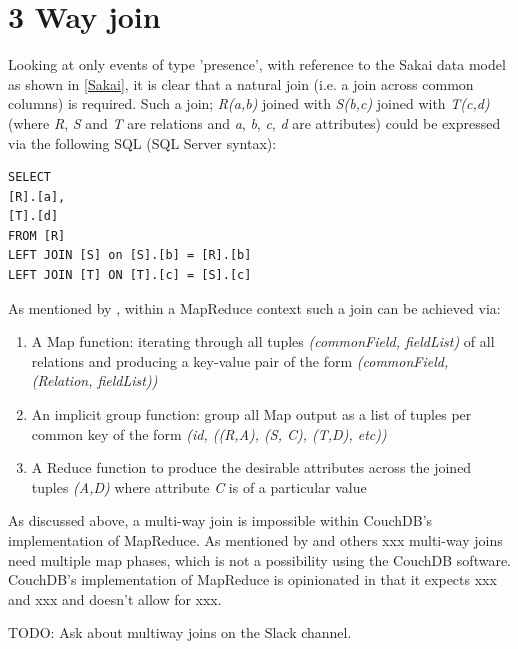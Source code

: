 \section{3 Way join}

Looking at only events of type 'presence', with reference to the Sakai data model as shown in \ref{Sakai}, it is clear that a natural join (i.e. a join across common columns) is required. Such a join; \textit{R(a,b)} joined with \textit{S(b,c)} joined with \textit{T(c,d)} (where \textit{R}, \textit{S} and \textit{T} are relations and \textit{a}, \textit{b}, \textit{c}, \textit{d} are attributes) could be expressed via the following SQL (SQL Server syntax):

\begin{verbatim}
SELECT
[R].[a],
[T].[d]
FROM [R]
LEFT JOIN [S] on [S].[b] = [R].[b]
LEFT JOIN [T] ON [T].[c] = [S].[c]
\end{verbatim}

As mentioned by \cite{mining2011}, within a MapReduce context such a join can be achieved via:
\begin{enumerate}
    \item A Map function: iterating through all tuples \textit{(commonField, fieldList)} of all relations and producing a key-value pair of the form \textit{(commonField, (Relation, fieldList))}
    \item An implicit group function: group all Map output as a list of tuples per common key of the form \textit{(id, ((R,A), (S, C), (T,D), etc))}
    \item A Reduce function to produce the desirable attributes across the joined tuples \textit{(A,D)} where attribute \textit{C} is of a particular value
\end{enumerate}

As discussed above, a multi-way join is impossible within CouchDB's implementation of MapReduce. As mentioned by \cite{chandar2010} and others xxx multi-way joins need multiple map phases, which is not a possibility using the CouchDB software. CouchDB's implementation of MapReduce is opinionated in that it expects xxx and xxx and doesn't allow for xxx.

TODO: Ask about multiway joins on the Slack channel.